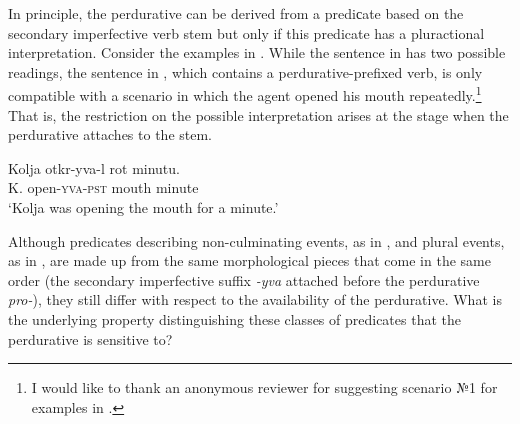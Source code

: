 \documentclass[output=paper,
]{langscibook}
\begin{document}
In principle, the perdurative can be derived from a prediсate based on the secondary imperfective verb stem but only if this predicate has a pluractional interpretation. Consider the examples in . While the sentence in  has two possible readings, the sentence in , which contains a perdurative-prefixed verb, is only compatible with a scenario in which the agent opened his mouth repeatedly.\footnote{I would like to thank an anonymous reviewer for suggesting scenario №1 for examples in .} That is, the restriction on the possible interpretation arises at the stage when the perdurative attaches to the stem.

\ea \label{ex:naumov:5} \ea \label{ex:naumov:5a}
\gll Kolja 		otkr-yva-l 		rot 		minutu.\\  
     K. 		open-\textsc{yva}-\textsc{pst} 	mouth 		minute\\ 
\glt `Kolja was opening the mouth for a minute.' \\
\z

\z\z


\noindent\sloppy Although predicates describing non-culminating events, as in , and plural events, as in , are made up from the same morphological pieces that come in the same order (the secondary imperfective suffix \textit{-yva} attached before the perdurative \textit{pro-}), they still differ with respect to the availability of the perdurative. What is the underlying property distinguishing these classes of predicates that the perdurative is sensitive to?
\end{document}
